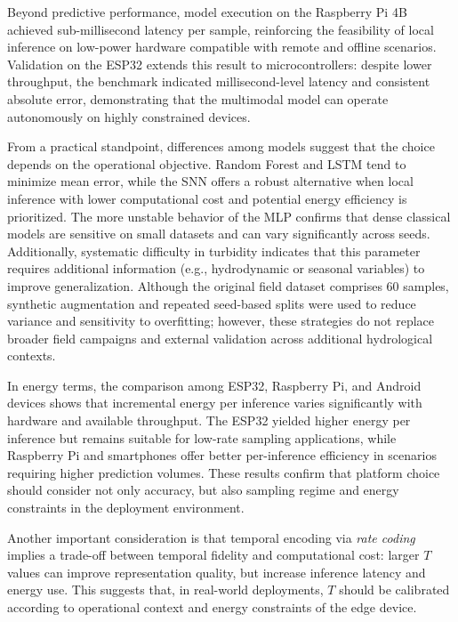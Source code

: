 Beyond predictive performance, model execution on the Raspberry Pi 4B achieved sub-millisecond
latency per sample, reinforcing the feasibility of local inference on low-power hardware
compatible with remote and offline scenarios. Validation on the ESP32 extends this result to
microcontrollers: despite lower throughput, the benchmark indicated millisecond-level latency
and consistent absolute error, demonstrating that the multimodal model can operate autonomously
on highly constrained devices.

From a practical standpoint, differences among models suggest that the choice depends on the
operational objective. Random Forest and LSTM tend to minimize mean error, while the SNN offers
a robust alternative when local inference with lower computational cost and potential energy
efficiency is prioritized. The more unstable behavior of the MLP confirms that dense classical
models are sensitive on small datasets and can vary significantly across seeds. Additionally,
systematic difficulty in turbidity indicates that this parameter requires additional
information (e.g., hydrodynamic or seasonal variables) to improve generalization.
Although the original field dataset comprises 60 samples, synthetic augmentation and repeated
seed-based splits were used to reduce variance and sensitivity to overfitting; however, these
strategies do not replace broader field campaigns and external validation across additional
hydrological contexts.

In energy terms, the comparison among ESP32, Raspberry Pi, and Android devices shows that
incremental energy per inference varies significantly with hardware and available throughput.
The ESP32 yielded higher energy per inference but remains suitable for low-rate sampling
applications, while Raspberry Pi and smartphones offer better per-inference efficiency in
scenarios requiring higher prediction volumes. These results confirm that platform choice
should consider not only accuracy, but also sampling regime and energy constraints in the
deployment environment.

Another important consideration is that temporal encoding via \textit{rate coding} implies a
trade-off between temporal fidelity and computational cost: larger $T$ values can improve
representation quality, but increase inference latency and energy use. This suggests that, in
real-world deployments, $T$ should be calibrated according to operational context and energy
constraints of the edge device.
